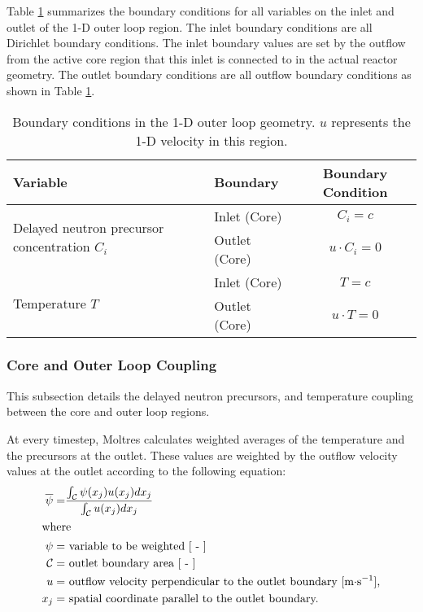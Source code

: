 Table \ref{table:loopbc} summarizes the boundary conditions for all variables
on the inlet and outlet of the 1-D outer loop region. The inlet boundary
conditions are all Dirichlet boundary conditions. The inlet boundary values
are set by the outflow from the active core region that this inlet is
connected to in the actual reactor geometry. The outlet boundary conditions
are all outflow boundary conditions as shown in Table \ref{table:loopbc}.

\begin{table}[htbp!]
    \small
	\caption{Boundary conditions in the 1-D outer loop geometry. $u$
	represents the 1-D velocity in this region.}
	\centering
	\begin{tabular}{ l l c}
		\toprule
		Variable & Boundary & Boundary Condition \\
        \midrule
        \multirow{2}{*}{Delayed neutron precursor concentration $C_i$} &
        Inlet (Core) & $C_i = c$ \\
        & Outlet (Core) & $u \cdot C_i = 0$ \\
        \midrule
        \multirow{2}{*}{Temperature $T$} &
        Inlet (Core) & $T = c$ \\
        & Outlet (Core) & $u \cdot T = 0$ \\
		\bottomrule
	\end{tabular}
	\label{table:loopbc}
\end{table}

\subsubsection{Core and Outer Loop Coupling}

This subsection details the delayed neutron precursors, and
temperature coupling between the core and outer loop regions. 

At every timestep, Moltres calculates weighted averages of the
temperature and the precursors at the outlet. These values are weighted by the
outflow velocity values at the outlet according to the following equation:
%
\begin{align}
    \overline{\psi} =& \frac{\int_\mathcal{C} \psi(x_j) u(x_j) dx_j}{
    \int_\mathcal{C} u(x_j) dx_j} \\
    \intertext{where}
    \psi =& \text{ variable to be weighted [ - ]} \nonumber \\
    \mathcal{C} =& \text{ outlet boundary area [ - ]} \nonumber \\
    u =& \text{ outflow velocity perpendicular to the outlet boundary
    [m$\cdot$s$^{-1}$],} \nonumber \\
    x_j =& \text{ spatial coordinate parallel to the outlet boundary.}
    \nonumber
\end{align}


